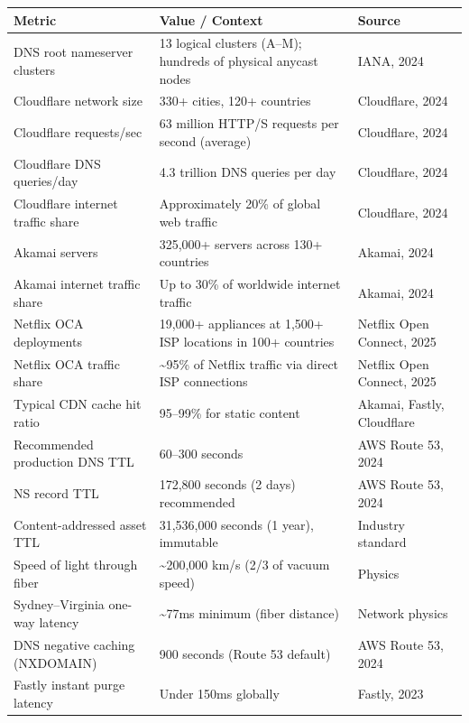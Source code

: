 \documentclass[11pt,a4paper]{article}
\begin{document}
\begin{center}
\small
\begin{tabularx}{\textwidth}{@{}lXl@{}}
\toprule
\textbf{Metric} & \textbf{Value / Context} & \textbf{Source} \\
\midrule
DNS root nameserver clusters & 13 logical clusters (A--M); hundreds of physical anycast nodes & IANA, 2024 \\
Cloudflare network size & 330+ cities, 120+ countries & Cloudflare, 2024 \\
Cloudflare requests/sec & 63 million HTTP/S requests per second (average) & Cloudflare, 2024 \\
Cloudflare DNS queries/day & 4.3 trillion DNS queries per day & Cloudflare, 2024 \\
Cloudflare internet traffic share & Approximately 20\% of global web traffic & Cloudflare, 2024 \\
Akamai servers & 325,000+ servers across 130+ countries & Akamai, 2024 \\
Akamai internet traffic share & Up to 30\% of worldwide internet traffic & Akamai, 2024 \\
Netflix OCA deployments & 19,000+ appliances at 1,500+ ISP locations in 100+ countries & Netflix Open Connect, 2025 \\
Netflix OCA traffic share & \textasciitilde{}95\% of Netflix traffic via direct ISP connections & Netflix Open Connect, 2025 \\
Typical CDN cache hit ratio & 95--99\% for static content & Akamai, Fastly, Cloudflare \\
Recommended production DNS TTL & 60--300 seconds & AWS Route 53, 2024 \\
NS record TTL & 172,800 seconds (2 days) recommended & AWS Route 53, 2024 \\
Content-addressed asset TTL & 31,536,000 seconds (1 year), immutable & Industry standard \\
Speed of light through fiber & \textasciitilde{}200,000 km/s (2/3 of vacuum speed) & Physics \\
Sydney--Virginia one-way latency & \textasciitilde{}77ms minimum (fiber distance) & Network physics \\
DNS negative caching (NXDOMAIN) & 900 seconds (Route 53 default) & AWS Route 53, 2024 \\
Fastly instant purge latency & Under 150ms globally & Fastly, 2023 \\
\bottomrule
\end{tabularx}
\end{center}
\end{document}
